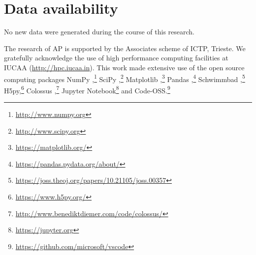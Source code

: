\section*{Data availability}
No new data were generated during the course of this research.

\acknowledgments
The research of AP is supported by the Associates scheme of ICTP, Trieste.
We gratefully acknowledge the use of high performance computing facilities at IUCAA (\url{http://hpc.iucaa.in}). This work made extensive use of the open source computing packages NumPy \citep{vanderwalt-numpy},\footnote{\url{http://www.numpy.org}} SciPy \citep{scipy},\footnote{\url{http://www.scipy.org}} Matplotlib \citep{hunter07_matplotlib},\footnote{\url{https://matplotlib.org/}} Pandas \citep[][]{reback2020pandas},\footnote{\url{https://pandas.pydata.org/about/}} Schwimmbad \citep{schwimmbad},\footnote{\url{https://joss.theoj.org/papers/10.21105/joss.00357}} H5py,\footnote{\url{https://www.h5py.org/}} Colossus \citep{colossus},\footnote{\url{http://www.benediktdiemer.com/code/colossus/}}  Jupyter Notebook\footnote{\url{https://jupyter.org}} and Code-OSS.\footnote{\url{https://github.com/microsoft/vscode}}






